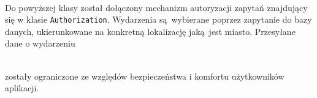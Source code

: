 \begin{code}
  
\end{code}\\

Do powyższej klasy został dołączony mechanizm autoryzacji zapytań znajdujący się w klasie \texttt{Authorization}. Wydarzenia są wybierane poprzez zapytanie do bazy danych, ukierunkowane na konkretną lokalizację jaką jest miasto. Przesyłane dane o wydarzeniu\\
\begin{code}
  
\end{code} \\

zostały ograniczone ze względów bezpieczeństwa i komfortu użytkowników aplikacji.
